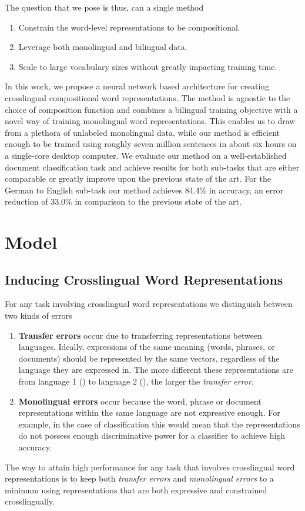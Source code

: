 \documentclass{article} \usepackage{iclr2015,times}
\begin{document}
The question that we pose is thus, can a single method
\begin{enumerate}
    \item{Constrain the word-level representations to be compositional.}
    \item{Leverage both monolingual and bilingual data.}
    \item{Scale to large vocabulary sizes
        without greatly impacting training time.}
\end{enumerate}
In this work, we propose a neural network based architecture for creating
crosslingual compositional word representations.
The method is agnostic to the choice of composition function and combines
a bilingual training objective with a novel way of training monolingual
word representations.
This enables us to draw from a plethora of unlabeled monolingual data,
while our method is efficient enough to be trained using roughly
seven million sentences in about six hours on a single-core desktop computer.
We evaluate our method on a well-established document classification task
and achieve results for both sub-tasks that are either comparable or
greatly improve upon the previous state of the art.
For the German to English sub-task our method achieves 84.4\% in accuracy,
an error reduction of 33.0\% in comparison to the previous state of the art.

\section{Model}

\subsection{Inducing Crosslingual Word Representations}

For any task involving crosslingual word representations we
distinguish between two kinds of errors
\begin{enumerate}
    \item{\textbf{Transfer errors} occur due
        to transferring representations between languages.
        Ideally, expressions of the same meaning
        (words, phrases, or documents) should be represented by the same vectors,
        regardless of the language they are expressed in.
        The more different these representations are
        from language 1 () to language 2 (),
        the larger the \emph{transfer error}.}
    \item{\textbf{Monolingual errors} occur because the word,
        phrase or document representations within the same language are not
        expressive enough. For example, in the case of classification this
        would mean that the representations do not possess enough
        discriminative power for a classifier to achieve high accuracy.}
\end{enumerate}
The way to attain high performance for any task that involves crosslingual
word representations is to keep both \emph{transfer errors} and
\emph{monolingual errors} to a minimum using representations that are
both expressive and constrained crosslingually.
\end{document}
